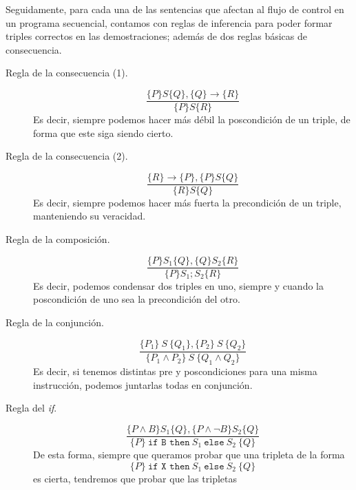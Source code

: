 Seguidamente, para cada una de las sentencias que afectan al flujo de control en un programa secuencial, contamos con reglas de inferencia para poder formar triples correctos en las demostraciones; además de dos reglas básicas de consecuencia.

\begin{description}
    \item [Regla de la consecuencia (1).] 
        \begin{equation*}
            \dfrac{\{P\}S\{Q\}, \{Q\}\rightarrow\{R\}}{\{P\}S\{R\}}
        \end{equation*}
        Es decir, siempre podemos hacer más débil la poscondición de un triple, de forma que este siga siendo cierto.
    \item [Regla de la consecuencia (2).] 
        \begin{equation*}
            \dfrac{\{R\}\rightarrow\{P\},\{P\}S\{Q\}}{\{R\}S\{Q\}}
        \end{equation*}
        Es decir, siempre podemos hacer más fuerta la precondición de un triple, manteniendo su veracidad.
    \item [Regla de la composición.] 
        \begin{equation*}
            \dfrac{\{P\}S_1\{Q\}, \{Q\}S_2\{R\}}{\{P\}S_1;S_2\{R\}}
        \end{equation*}
        Es decir, podemos condensar dos triples en uno, siempre y cuando la poscondición de uno sea la precondición del otro.
    \item [Regla de la conjunción.] 
        \begin{equation*}
            \dfrac{\{P_1\}\ S\ \{Q_1\}, \{P_2\}\ S\ \{Q_2\}}{\{P_1 \land P_2\}\ S\ \{Q_1 \land Q_2\}}
        \end{equation*}
        Es decir, si tenemos distintas pre y poscondiciones para una misma instrucción, podemos juntarlas todas en conjunción.
    \item [Regla del \textit{if}.] 
        \begin{equation*}
            \dfrac{\{P\land B\}S_1\{Q\}, \{P\land \lnot B\}S_2\{Q\}}{\{P\}\ \texttt{if B then}\ S_1\ \texttt{else}\ S_2\ \{Q\}}
        \end{equation*}
        De esta forma, siempre que queramos probar que una tripleta de la forma
        \begin{equation*}
            \{P\}\ \texttt{if X then}\ S_1\ \texttt{else}\ S_2\ \{Q\}
        \end{equation*}
        es cierta, tendremos que probar que las tripletas

\end{description}
